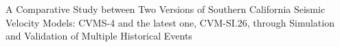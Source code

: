 % 
 A Comparative Study between Two Versions of Southern California Seismic Velocity Models: CVMS-4 and the latest one, CVM-SI.26, through Simulation and Validation of Multiple Historical Events
% 

